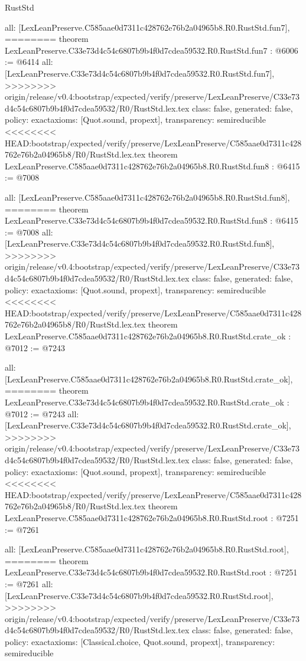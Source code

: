 \begin{lexlean}{RustStd}
\begin{coremodule}
{\begin{coremodule}
{{{{{{{{{{  all: [LexLeanPreserve.C585aae0d7311c428762e76b2a04965b8.R0.RustStd.fun7],
========
theorem LexLeanPreserve.C33e73d4c54c6807b9b4f0d7cdea59532.R0.RustStd.fun7 : @6006 := @6414 {
  all: [LexLeanPreserve.C33e73d4c54c6807b9b4f0d7cdea59532.R0.RustStd.fun7],
>>>>>>>> origin/release/v0.4:bootstrap/expected/verify/preserve/LexLeanPreserve/C33e73d4c54c6807b9b4f0d7cdea59532/R0/RustStd.lex.tex
  class: false,
  generated: false,
  policy: exact{axioms: [Quot.sound, propext]},
  transparency: semireducible
}
<<<<<<<< HEAD:bootstrap/expected/verify/preserve/LexLeanPreserve/C585aae0d7311c428762e76b2a04965b8/R0/RustStd.lex.tex
theorem LexLeanPreserve.C585aae0d7311c428762e76b2a04965b8.R0.RustStd.fun8 : @6415 := @7008 {
  all: [LexLeanPreserve.C585aae0d7311c428762e76b2a04965b8.R0.RustStd.fun8],
========
theorem LexLeanPreserve.C33e73d4c54c6807b9b4f0d7cdea59532.R0.RustStd.fun8 : @6415 := @7008 {
  all: [LexLeanPreserve.C33e73d4c54c6807b9b4f0d7cdea59532.R0.RustStd.fun8],
>>>>>>>> origin/release/v0.4:bootstrap/expected/verify/preserve/LexLeanPreserve/C33e73d4c54c6807b9b4f0d7cdea59532/R0/RustStd.lex.tex
  class: false,
  generated: false,
  policy: exact{axioms: [Quot.sound, propext]},
  transparency: semireducible
}
<<<<<<<< HEAD:bootstrap/expected/verify/preserve/LexLeanPreserve/C585aae0d7311c428762e76b2a04965b8/R0/RustStd.lex.tex
theorem LexLeanPreserve.C585aae0d7311c428762e76b2a04965b8.R0.RustStd.crate_ok : @7012 := @7243 {
  all: [LexLeanPreserve.C585aae0d7311c428762e76b2a04965b8.R0.RustStd.crate_ok],
========
theorem LexLeanPreserve.C33e73d4c54c6807b9b4f0d7cdea59532.R0.RustStd.crate_ok : @7012 := @7243 {
  all: [LexLeanPreserve.C33e73d4c54c6807b9b4f0d7cdea59532.R0.RustStd.crate_ok],
>>>>>>>> origin/release/v0.4:bootstrap/expected/verify/preserve/LexLeanPreserve/C33e73d4c54c6807b9b4f0d7cdea59532/R0/RustStd.lex.tex
  class: false,
  generated: false,
  policy: exact{axioms: [Quot.sound, propext]},
  transparency: semireducible
}
<<<<<<<< HEAD:bootstrap/expected/verify/preserve/LexLeanPreserve/C585aae0d7311c428762e76b2a04965b8/R0/RustStd.lex.tex
theorem LexLeanPreserve.C585aae0d7311c428762e76b2a04965b8.R0.RustStd.root : @7251 := @7261 {
  all: [LexLeanPreserve.C585aae0d7311c428762e76b2a04965b8.R0.RustStd.root],
========
theorem LexLeanPreserve.C33e73d4c54c6807b9b4f0d7cdea59532.R0.RustStd.root : @7251 := @7261 {
  all: [LexLeanPreserve.C33e73d4c54c6807b9b4f0d7cdea59532.R0.RustStd.root],
>>>>>>>> origin/release/v0.4:bootstrap/expected/verify/preserve/LexLeanPreserve/C33e73d4c54c6807b9b4f0d7cdea59532/R0/RustStd.lex.tex
  class: false,
  generated: false,
  policy: exact{axioms: [Classical.choice, Quot.sound, propext]},
  transparency: semireducible
}

}}}}}}}}}}}}}
\end{coremodule}}
\end{coremodule}
\end{lexlean}
